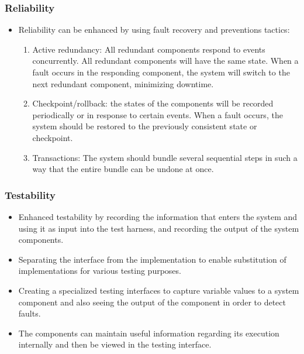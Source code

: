 \subsubsection*{Reliability}
	\begin{itemize}
		\item Reliability can be enhanced by using fault recovery and preventions tactics:
		\begin{enumerate}
			\item Active redundancy: All redundant components respond to events concurrently. All redundant components will have the same state. When a fault occurs in the responding component, the system will switch to the next redundant component, minimizing downtime.
			\item Checkpoint/rollback: the states of the components will be recorded periodically or in response to certain events. When a fault occurs, the system should be restored to the previously consistent state or checkpoint.
			\item Transactions: The system should bundle several sequential steps in such a way that the entire bundle can be undone at once. 
		\end{enumerate}
	\end{itemize}
\subsubsection*{Testability}
	\begin{itemize}
		\item Enhanced testability by recording the information that enters the system and using it as input into the test harness, and recording the output of the system components.
		\item Separating the interface from the implementation to enable substitution of implementations for various testing purposes.
		\item Creating a specialized testing interfaces to capture variable values to a system component and also seeing the output of the component in order to detect faults.
		\item The components can maintain useful information regarding its execution internally and then be viewed in the testing interface.
	\end{itemize}